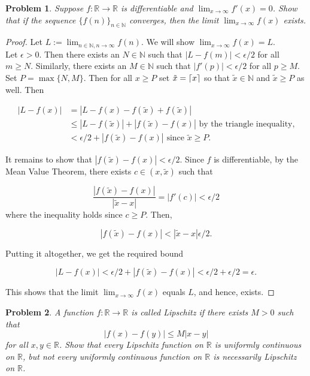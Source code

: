 \documentclass[11pt,twoside]{amsart}
\DeclarePairedDelimiter{\ceil}{\lceil}{\rceil}
\theoremstyle{plain}
\newtheorem{prob}{Problem}
\newcommand{\RR}{\mathbb{R}}
\newcommand{\NN}{\mathbb{N}}
\begin{document}
\newpage
\begin{prob}
  Suppose $f: \RR \to \RR$ is differentiable and $\lim_{x \to \infty} f'(x) = 0$. Show that 
  if the sequence $\{f(n)\}_{n \in \NN}$ converges, then the limit $\lim_{x \to \infty} f(x)$ exists. 
\end{prob}
\begin{proof}
  Let $L := \lim_{n \in \NN, n \to \infty} f(n)$. We will show $\lim_{x \to \infty} f(x) = L$.\\
  Let $\epsilon > 0$. Then there exists an $N \in \NN$ such that $|L - f(m)| < \epsilon/2$ for all 
  $m \geq N$. Similarly, there exists an $M \in \NN$ such that $|f'(p)| < \epsilon/2$ for all 
  $p \geq M$. Set $P = \max\{ N, M \}$. Then for all $x \geq P$ set $\tilde{x} = \ceil{x}$
  so that $\tilde{x} \in \NN$ and $\tilde{x} \geq P$ as well. Then 

  \begin{align*}
    |L - f(x)| &= |L - f(x) - f(\tilde{x}) + f(\tilde{x})|\\
               &\leq |L - f(\tilde{x})| + |f(\tilde{x}) - f(x)| \text{ by the triangle inequality,}\\
               &< \epsilon/2 + |f(\tilde{x}) - f(x)| \text{ since } \tilde{x} \geq P. 
  \end{align*}

  It remains to show that $|f(\tilde{x}) - f(x)| < \epsilon/2$. Since $f$ is differentiable, by the 
  Mean Value Theorem, there exists $c \in (x, \tilde{x})$ such that 
  
  \begin{equation*}
    \frac{|f(\tilde{x}) - f(x)|}{|\tilde{x} - x|} = |f'(c)| < \epsilon/2 
  \end{equation*}
  where the inequality holds since $c \geq P$. Then, 

  \begin{equation*}
    |f(\tilde{x}) - f(x)| <  |\tilde{x} - x|\epsilon/2.
  \end{equation*}

  Putting it altogether, we get the required bound 

  \begin{equation*}
    |L - f(x)| < \epsilon/2 + |f(\tilde{x}) - f(x)| < \epsilon/2 + \epsilon/2 = \epsilon. 
  \end{equation*}

  This shows that the limit $\lim_{x \to \infty} f(x)$ equals $L$, and hence, exists. 
\end{proof}

\newpage
\begin{prob}
  A function $f: \RR \to \RR$ is called Lipschitz if there exists $M > 0$ such that 
  \begin{equation*}
    |f(x) - f(y)| \leq M|x-y|
  \end{equation*}
  for all $x,y \in \RR$. Show that every Lipschitz function on $\RR$ is uniformly continuous on $\RR$,
  but not every uniformly continuous function on $\RR$ is necessarily Lipschitz on $\RR$. 
\end{prob}
\end{document}
